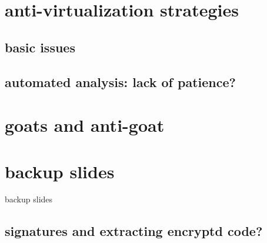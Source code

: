 \section{anti-virtualization strategies}
\subsection{basic issues}


\subsection{automated analysis: lack of patience?}


\section{goats and anti-goat}


\section{backup slides}
\begin{frame}{backup slides}
\end{frame}


\subsection{signatures and extracting encryptd code?}



